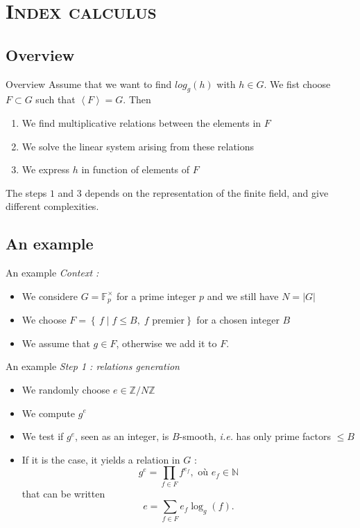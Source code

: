 \documentclass[xcolor=x11names,compress]{beamer}
\theoremstyle{break}
\theoremstyle{sc}
\theoremstyle{definition}
\theoremstyle{remark}
\newcommand{\ie}{\emph{i.e. }}
\begin{document}
\section{\scshape Index calculus}
\subsection{Overview}
\begin{frame}{Overview}
  Assume that we want to find $log_g(h)$ with $h\in G$. We fist choose $F\subset
  G$ such that $\left\langle F \right\rangle = G$. Then
  \begin{enumerate}
    \item We find multiplicative relations between the elements in $F$
    \item We solve the linear system arising from these relations
    \item We express $h$ in function of elements of $F$
  \end{enumerate}
  The steps $1$ and $3$ depends on the representation of the finite field, and
  give different complexities.
\end{frame}

\subsection{An example}
\begin{frame}{An example}
  \emph{Context :}
  \begin{itemize}
    \item We considere $G = \mathbb{F}_p^\times$ for a prime integer $p$ and we
      still have $N = |G|$
    \item We choose $F = \left\{\, f \;|\; f \leq B,\; f \text{ premier}
    \right\}$ for a chosen integer $B$
  \item We assume that $g\in F$, otherwise we add it to $F$.
  \end{itemize}
\end{frame}

\begin{frame}{An example}
  \emph{Step 1 : relations generation}
  \begin{itemize}
    \item We randomly choose $e\in \mathbb{Z}/N\mathbb{Z}$
    \item We compute $g^e$
    \item We test if $g^e$, seen as an integer, is $B$-smooth, \ie has only
      prime factors $\leq B$
    \item If it is the case, it yields a relation in $G$ :
      \[ 
        g^e = \prod_{f\in F}f^{e_f}, \text{ où } e_f\in \mathbb{N}
      \]
      that can be written
      \[
        e = \sum_{f\in F}e_f\log_g(f).
      \]
  \end{itemize}
\end{frame}
\end{document}
